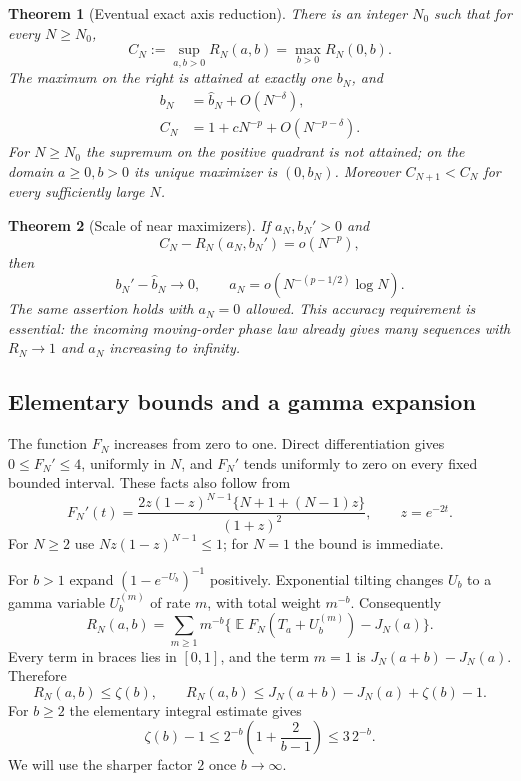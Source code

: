 \documentclass[11pt]{article}
\numberwithin{equation}{section}
\newtheorem{theorem}{Theorem}[section]
\theoremstyle{definition}
\theoremstyle{remark}
\DeclareMathOperator{\E}{\mathbb E}
\begin{document}
\begin{theorem}[Eventual exact axis reduction]\label{eul:thm:main}
There is an integer $N_0$ such that for every $N\geq N_0$,
\begin{equation}\label{eul:eq:axisexact}
 C_N:=\sup_{a,b>0}R_N(a,b)
   =\max_{b>0}R_N(0,b).
\end{equation}
The maximum on the right is attained at exactly one $b_N$, and
\begin{align}
 b_N&=\widehat b_N+O(N^{-\delta}),\label{eul:eq:bn}\\
 C_N&=1+cN^{-p}+O(N^{-p-\delta}).\label{eul:eq:cn}
\end{align}
For $N\geq N_0$ the supremum on the positive quadrant is not attained;
on the domain $a\geq0,b>0$ its unique maximizer is $(0,b_N)$.
Moreover $C_{N+1}<C_N$ for every sufficiently large $N$.
\end{theorem}

\begin{theorem}[Scale of near maximizers]\label{eul:thm:near}
If $a_N,b_N'>0$ and
\[
 C_N-R_N(a_N,b_N')=o(N^{-p}),
\]
then
\[
 b_N'-\widehat b_N\longrightarrow0,
 \qquad
 a_N=o\!\left(N^{-(p-1/2)}\log N\right).
\]
The same assertion holds with $a_N=0$ allowed.  This accuracy requirement
is essential: the incoming moving-order phase law already gives many
sequences with $R_N\to1$ and $a_N$ increasing to infinity.
\end{theorem}

\subsection{Elementary bounds and a gamma expansion}
The function $F_N$ increases from zero to one.  Direct differentiation
gives $0\leq F_N'\leq4$, uniformly in $N$, and $F_N'$ tends uniformly
to zero on every fixed bounded interval.  These facts also follow from
\[
 F_N'(t)=\frac{2z(1-z)^{N-1}\{N+1+(N-1)z\}}{(1+z)^2},
 \qquad z=e^{-2t}.
\]
For $N\geq2$ use $Nz(1-z)^{N-1}\leq1$; for $N=1$ the bound is
immediate.

For $b>1$ expand $(1-e^{-U_b})^{-1}$ positively.  Exponential tilting
changes $U_b$ to a gamma variable $U_b^{(m)}$ of rate $m$, with total
weight $m^{-b}$.  Consequently
\begin{equation}\label{eul:eq:seriesR}
 R_N(a,b)=\sum_{m\geq1}m^{-b}
  \{\E F_N(T_a+U_b^{(m)})-J_N(a)\}.
\end{equation}
Every term in braces lies in $[0,1]$, and the term $m=1$ is
$J_N(a+b)-J_N(a)$.  Therefore
\begin{equation}\label{eul:eq:rough}
 R_N(a,b)\leq\zeta(b),\qquad
 R_N(a,b)\leq J_N(a+b)-J_N(a)+\zeta(b)-1.
\end{equation}
For $b\geq2$ the elementary integral estimate gives
\begin{equation}\label{eul:eq:zetabound}
 \zeta(b)-1\leq2^{-b}\left(1+\frac2{b-1}\right)\leq3\,2^{-b}.
\end{equation}
We will use the sharper factor $2$ once $b\to\infty$.
\end{document}
